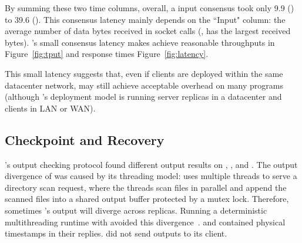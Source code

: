 By summing these two time columns, overall, a \xxx input consensus took only
9.9 \us (\redis) to 39.6 \us (\mongodb). This consensus latency mainly depends
on the ``Input" column: the average number of data bytes received in socket
calls (\eg, \mongodb has the largest received bytes). \xxx's small consensus
latency makes \xxx achieve reasonable throughputs in Figure~\ref{fig:tput} and
response times Figure~\ref{fig:latency}.

This small latency suggests that, even if clients are deployed within the same
datacenter network, \xxx may still achieve acceptable overhead on many programs
(although \xxx's deployment model is running server replicas in a datacenter and
clients in LAN
or WAN).













\subsection{Checkpoint and Recovery} \label{sec:robust}

\xxx's output checking protocol found different output results on \clamav,
\openldap, and \mediatomb. The output divergence of \clamav was caused by its
threading model: \clamav uses multiple threads to serve a directory scan
request, where the threads scan files in parallel and append the scanned files
into a shared output buffer protected by a mutex lock. Therefore, sometimes
\clamav's output will diverge across replicas. Running a deterministic
multithreading runtime with \clamav avoided this divergence~\cite{crane:sosp15}.
\openldap and \mediatomb contained physical timestamps in their replies.
\calvin did not send outputs to its client.

